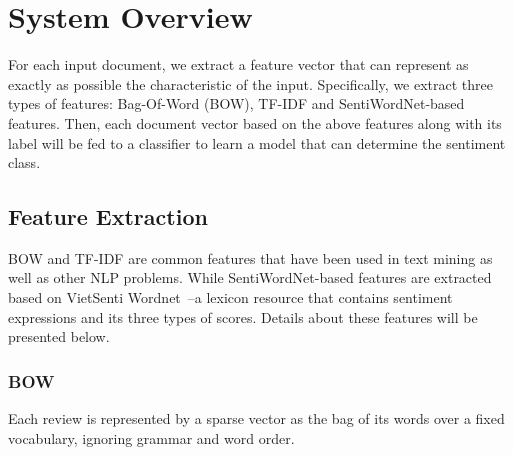 \documentclass[conference,compsoc]{IEEEtran}
\begin{document}


\section{System Overview}
For each input document, we extract a feature vector that can represent as exactly as possible the characteristic of the input. Specifically, we extract three types of features: Bag-Of-Word (BOW), TF-IDF and SentiWordNet-based features.
Then, each document vector based on the above features along with its label will be fed to a classifier to learn a model that can determine the sentiment class.

\subsection{Feature Extraction}
BOW and TF-IDF are common features that have been used in text mining as well as other NLP problems. While SentiWordNet-based features are extracted based on VietSenti Wordnet~\cite{Xuan-Son-Vu:2014}--a lexicon resource that contains sentiment expressions and its three types of scores. Details about these features will be presented below.
\subsubsection{BOW}
Each review is represented by a sparse vector as the bag of its words over a fixed vocabulary, ignoring grammar and word order.
\end{document}
